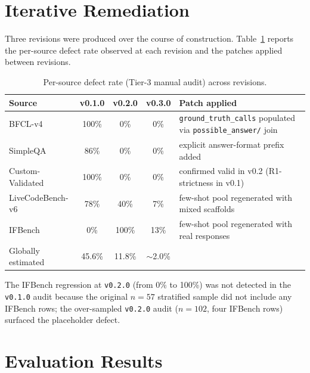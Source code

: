 \documentclass[11pt,a4paper]{article}
\begin{document}
\section{Iterative Remediation}\label{sec:remediation}

Three revisions were produced over the course of construction. Table~\ref{tab:remediation} reports the per-source defect rate observed at each revision and the patches applied between revisions.

\begin{table}[ht]
\centering
\caption{Per-source defect rate (Tier-3 manual audit) across revisions.}
\label{tab:remediation}
\small
\begin{tabular}{l c c c l}
\toprule
\textbf{Source} & \textbf{v0.1.0} & \textbf{v0.2.0} & \textbf{v0.3.0} & \textbf{Patch applied} \\
\midrule
BFCL-v4            & 100\% & 0\%   & 0\%  & \texttt{ground\_truth\_calls} populated via \texttt{possible\_answer/} join \\
SimpleQA           & 86\%  & 0\%   & 0\%  & explicit answer-format prefix added \\
Custom-Validated   & 100\% & 0\%   & 0\%  & confirmed valid in v0.2 (R1-strictness in v0.1) \\
LiveCodeBench-v6   & 78\%  & 40\%  & 7\%  & few-shot pool regenerated with mixed scaffolds \\
IFBench            & 0\%   & 100\% & 13\% & few-shot pool regenerated with real responses \\
\midrule
Globally estimated & 45.6\% & 11.8\% & $\sim$2.0\% & \\
\bottomrule
\end{tabular}
\end{table}

The IFBench regression at \texttt{v0.2.0} (from 0\% to 100\%) was not detected in the \texttt{v0.1.0} audit because the original $n{=}57$ stratified sample did not include any IFBench rows; the over-sampled \texttt{v0.2.0} audit ($n{=}102$, four IFBench rows) surfaced the placeholder defect.

\section{Evaluation Results}\label{sec:evaluation}
\end{document}
